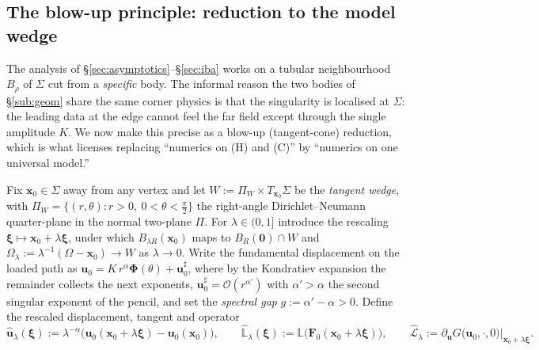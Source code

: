 \subsection{The blow-up principle: reduction to the model wedge}
\label{sub:blowup}

The analysis of \S\ref{sec:asymptotics}--\S\ref{sec:iba} works on a tubular neighbourhood $B_\rho$ of $\Sigma$ cut from
a \emph{specific} body. The informal reason the two bodies of \S\ref{sub:geom} share the same corner physics is that
the singularity is localised at $\Sigma$: the leading data at the edge cannot feel the far field except through the
single amplitude $K$. We now make this precise as a blow-up (tangent-cone) reduction, which is what licenses replacing
``numerics on (H) and (C)'' by ``numerics on one universal model.''

Fix $\bm{x}_0\in\Sigma$ away from any vertex and let $W:=\Pi_W\times T_{\bm{x}_0}\Sigma$ be the \emph{tangent wedge},
with $\Pi_W=\{(r,\theta):r>0,\ 0<\theta<\tfrac\pi2\}$ the right-angle Dirichlet--Neumann quarter-plane in the normal
two-plane $\Pi$. For $\lambda\in(0,1]$ introduce the rescaling $\bm{\xi}\mapsto\bm{x}_0+\lambda\bm{\xi}$, under which
$B_{\lambda R}(\bm{x}_0)$ maps to $B_R(\bm0)\cap W$ and $\Omega_\lambda:=\lambda^{-1}(\Omega-\bm{x}_0)\to W$ as
$\lambda\to0$. Write the fundamental displacement on the loaded path as
$\bm{u}_0=K\,r^{\alpha}\bm{\Phi}(\theta)+\bm{u}_0^{\sharp}$, where by the Kondratiev expansion the remainder collects
the next exponents, $\bm{u}_0^{\sharp}=\mathcal{O}(r^{\alpha'})$ with $\alpha'>\alpha$ the second singular exponent of
the pencil, and set the \emph{spectral gap} $g:=\alpha'-\alpha>0$. Define the rescaled displacement, tangent and
operator
\begin{equation}
    \label{eq:rescale}
    \hat{\bm{u}}_\lambda(\bm{\xi}):=\lambda^{-\alpha}\big(\bm{u}_0(\bm{x}_0+\lambda\bm{\xi})-\bm{u}_0(\bm{x}_0)\big),
    \qquad
    \widehat{\mathbb{L}}_\lambda(\bm{\xi}):=\mathbb{L}\big(\bm{F}_0(\bm{x}_0+\lambda\bm{\xi})\big),
    \qquad
    \widehat{\mathcal{L}}_\lambda:=\partial_{\bm{u}}G\big(\bm{u}_0,\cdot,0\big)\big|_{\bm{x}_0+\lambda\bm{\xi}} .
\end{equation}

